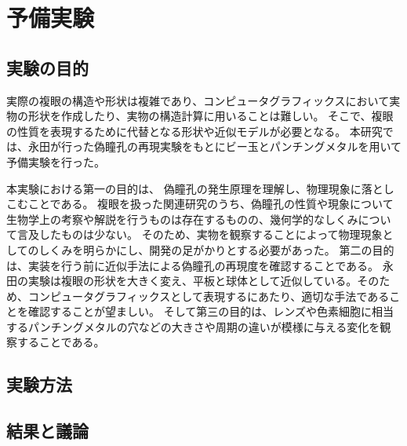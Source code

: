 \chapter{予備実験}
\label{CExperiment}

\section{実験の目的}
\label{SExperimentPurpose}


実際の複眼の構造や形状は複雑であり、コンピュータグラフィックスにおいて実物の形状を作成したり、実物の構造計算に用いることは難しい。
そこで、複眼の性質を表現するために代替となる形状や近似モデルが必要となる。
本研究では、永田\cite{}が行った偽瞳孔の再現実験をもとにビー玉とパンチングメタルを用いて予備実験を行った。

本実験における第一の目的は、 偽瞳孔の発生原理を理解し、物理現象に落としこむことである。
複眼を扱った関連研究のうち、偽瞳孔の性質や現象について生物学上の考察や解説を行うものは存在するものの、幾何学的なしくみについて言及したものは少ない。
そのため、実物を観察することによって物理現象としてのしくみを明らかにし、開発の足がかりとする必要があった。
第二の目的は、実装を行う前に近似手法による偽瞳孔の再現度を確認することである。
永田の実験は複眼の形状を大きく変え、平板と球体として近似している。そのため、コンピュータグラフィックスとして表現するにあたり、適切な手法であることを確認することが望ましい。
そして第三の目的は、レンズや色素細胞に相当するパンチングメタルの穴などの大きさや周期の違いが模様に与える変化を観察することである。

\section{実験方法}
\label{SExperimentMethod}



\section{結果と議論}
\label{SExperimentResult}

